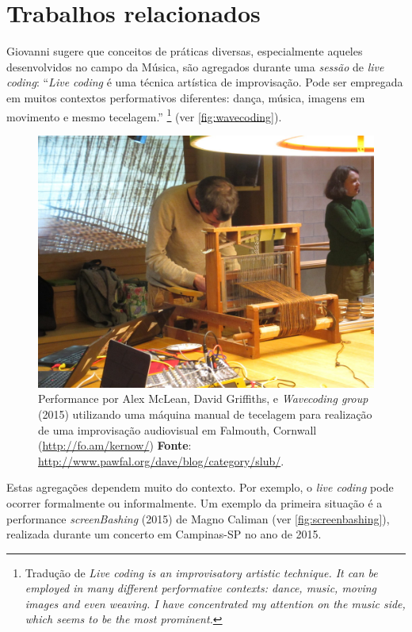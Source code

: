\chapter{Trabalhos relacionados}\label{cap:introducao}

Giovanni  sugere que conceitos de práticas diversas, especialmente aqueles desenvolvidos no campo da Música, são agregados durante uma \emph{sessão} de \emph{live coding}: ``\emph{Live coding} é uma técnica artística de improvisação. Pode ser empregada em muitos contextos performativos diferentes: dança, música, imagens em movimento e mesmo tecelagem.'' \cite[p.~117]{mori_analysing_2015}\footnote{Tradução de \emph{Live coding is an improvisatory artistic technique. It can be employed in many different performative contexts: dance, music, moving images and even weaving. I have concentrated my attention on the music side, which seems to be the most prominent.}} (ver \autoref{fig:wavecoding}).

\begin{figure}[!h]
  \centering
  \includegraphics[scale=0.85]{imagens/wavecoding.jpg}
  \caption{Performance por Alex McLean,  David Griffiths, e \emph{Wavecoding group} (2015) utilizando uma máquina manual de tecelagem para realização de uma improvisação audiovisual em Falmouth, Cornwall (\url{http://fo.am/kernow/}) \textbf{Fonte}: \url{http://www.pawfal.org/dave/blog/category/slub/}.}
  \label{fig:wavecoding}
\end{figure}

Estas agregações dependem muito do contexto. Por exemplo, o \emph{live coding} pode ocorrer formalmente ou informalmente. Um exemplo da primeira situação é a performance \emph{screenBashing} (2015) de Magno Caliman (ver \autoref{fig:screenbashing}), realizada durante um concerto em Campinas-SP no ano de 2015. 

